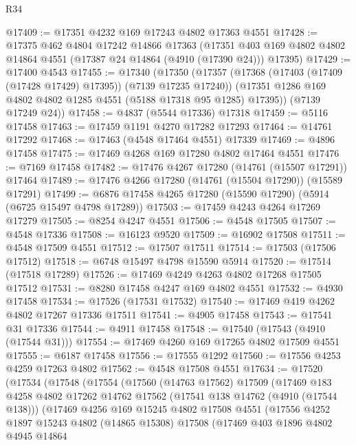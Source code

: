 \begin{lexlean}{R34}
\begin{coremodule}
@17409 := @17351 @4232 @169 @17243 @4802 @17363 @4551
@17428 := @17375
    @462
    @4804
    @17242
    @14866
    @17363
    (@17351 @403 @169 @4802 @4802 @14864 @4551 (@17387 @24 @14864 (@4910 (@17390 @24))) @17395)
@17429 := @17400 @4543
@17455 := @17340
    (@17350
      (@17357
        (@17368 (@17403 (@17409 (@17428 @17429) @17395)) (@7139 @17235 @17240))
        (@17351 @1286 @169 @4802 @4802 @1285 @4551 (@5188 @17318 @95 @1285) @17395))
      (@7139 @17249 @24))
@17458 := @4837 (@5544 @17336) @17318
@17459 := @5116 @17458
@17463 := @17459 @1191 @4270 @17282 @17293
@17464 := @14761 @17292
@17468 := @17463 (@4548 @17464 @4551) @17339
@17469 := @4896 @17458
@17475 := @17469 @4268 @169 @17280 @4802 @17464 @4551
@17476 := @7169 @17458
@17482 := @17476 @4267 @17280 (@14761 (@15507 @17291)) @17464
@17489 := @17476 @4266 @17280 (@14761 (@15504 @17290)) (@15589 @17291)
@17499 := @6876 @17458 @4265 @17280 (@15590 @17290) (@5914 (@6725 @15497 @4798 @17289))
@17503 := @17459 @4243 @4264 @17269 @17279
@17505 := @8254 @4247 @4551
@17506 := @4548 @17505
@17507 := @4548 @17336
@17508 := @16123 @9520
@17509 := @16902 @17508
@17511 := @4548 @17509 @4551
@17512 := @17507 @17511
@17514 := @17503 (@17506 @17512)
@17518 := @6748 @15497 @4798 @15590 @5914
@17520 := @17514 (@17518 @17289)
@17526 := @17469 @4249 @4263 @4802 @17268 @17505 @17512
@17531 := @8280 @17458 @4247 @169 @4802 @4551
@17532 := @4930 @17458
@17534 := @17526 (@17531 @17532)
@17540 := @17469 @419 @4262 @4802 @17267 @17336 @17511
@17541 := @4905 @17458
@17543 := @17541 @31 @17336
@17544 := @4911 @17458
@17548 := @17540 (@17543 (@4910 (@17544 @31)))
@17554 := @17469 @4260 @169 @17265 @4802 @17509 @4551
@17555 := @6187 @17458
@17556 := @17555 @1292
@17560 := @17556 @4253 @4259 @17263 @4802
@17562 := @4548 @17508 @4551
@17634 := @17520
    (@17534
      (@17548
        (@17554
          (@17560
            (@14763 @17562)
            @17509
            (@17469
              @183
              @4258
              @4802
              @17262
              @14762
              @17562
              (@17541 @138 @14762 (@4910 (@17544 @138)))
              (@17469
                @4256
                @169
                @15245
                @4802
                @17508
                @4551
                (@17556
                  @4252
                  @1897
                  @15243
                  @4802
                  (@14865 @15308)
                  @17508
                  (@17469
                    @403
                    @1896
                    @4802
                    @4945
                    @14864

\end{coremodule}
\end{lexlean}
